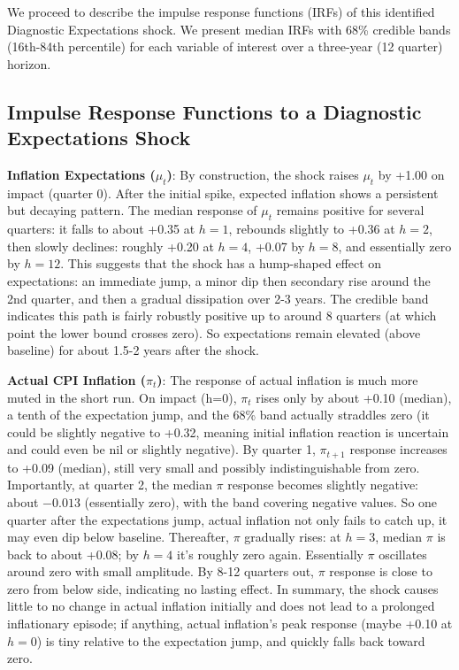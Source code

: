 \documentclass[12pt]{article}
\begin{document}
We proceed to describe the impulse response functions (IRFs) of this identified Diagnostic Expectations shock. We present median IRFs with 68\% credible bands (16th-84th percentile) for each variable of interest over a three-year (12 quarter) horizon.

\subsection{Impulse Response Functions to a Diagnostic Expectations Shock}
\textbf{Inflation Expectations ($\mu_t$)}: By construction, the shock raises $\mu_t$ by +1.00 on impact (quarter 0). After the initial spike, expected inflation shows a persistent but decaying pattern. The median response of $\mu_t$ remains positive for several quarters: it falls to about +0.35 at $h=1$, rebounds slightly to +0.36 at $h=2$, then slowly declines: roughly +0.20 at $h=4$, +0.07 by $h=8$, and essentially zero by $h=12$. This suggests that the shock has a hump-shaped effect on expectations: an immediate jump, a minor dip then secondary rise around the 2nd quarter, and then a gradual dissipation over 2-3 years. The credible band indicates this path is fairly robustly positive up to around 8 quarters (at which point the lower bound crosses zero). So expectations remain elevated (above baseline) for about 1.5-2 years after the shock.

\textbf{Actual CPI Inflation ($\pi_t$)}: The response of actual inflation is much more muted in the short run. On impact (h=0), $\pi_t$ rises only by about +0.10 (median), a tenth of the expectation jump, and the 68\% band actually straddles zero (it could be slightly negative to +0.32, meaning initial inflation reaction is uncertain and could even be nil or slightly negative). By quarter 1, $\pi_{t+1}$ response increases to +0.09 (median), still very small and possibly indistinguishable from zero. Importantly, at quarter 2, the median $\pi$ response becomes slightly negative: about $-0.013$ (essentially zero), with the band covering negative values. So one quarter after the expectations jump, actual inflation not only fails to catch up, it may even dip below baseline. Thereafter, $\pi$ gradually rises: at $h=3$, median $\pi$ is back to about +0.08; by $h=4$ it's roughly zero again. Essentially $\pi$ oscillates around zero with small amplitude. By 8-12 quarters out, $\pi$ response is close to zero from below side, indicating no lasting effect. In summary, the shock causes little to no change in actual inflation initially and does not lead to a prolonged inflationary episode; if anything, actual inflation's peak response (maybe +0.10 at $h=0$) is tiny relative to the expectation jump, and quickly falls back toward zero.
\end{document}
